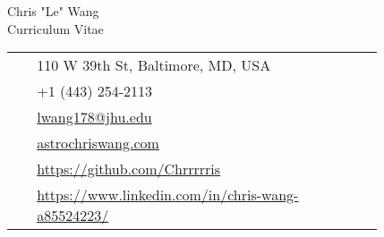 \documentclass[10pt]{article} %
\begin{document}
\begin{paracol}{2}

\parbox[top][0.12\textheight][c]{\linewidth}{ %
	\vspace{-0.04\textheight} %
	\centering %
	{\sffamily\Huge Chris "Le" Wang}\\\medskip %
	{\Huge\color{headings}\cvtextfont Curriculum Vitae}
}

\switchcolumn %

\parbox[top][0.12\textheight][c]{\linewidth}{ %
	\vspace{-0.04\textheight} %
	\colorbox{shade}{ %
		\begin{supertabular}{p{0.05\linewidth}|p{0.775\linewidth}} %
			\raisebox{-1pt}{\faHome} & 110 W 39th St, Baltimore, MD, USA \\ %
			\raisebox{-1pt}{\faPhone} & +1 (443) 254-2113 \\ %
			\raisebox{0pt}{\small\faEnvelope} & \href{mailto:lwang178@jhu.edu}{lwang178@jhu.edu} \\ %
			\raisebox{-1pt}{\small\faDesktop} & \href{https://astrochriswang.com}{astrochriswang.com} \\ %
			\raisebox{-1pt}{\faGithub} & \href{https://github.com/Chrrrrris}{https://github.com/Chrrrrris} \\ %
			\raisebox{-1pt}{\faLinkedinSquare} & \href{https://www.linkedin.com/in/chris-wang-a85524223/}{https://www.linkedin.com/in/chris-wang-a85524223/} \\ %
		\end{supertabular}
	}
}

\end{paracol}
\end{document}
